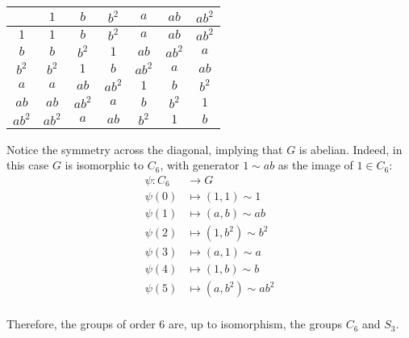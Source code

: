 \begin{center}
  \begin{table}[H]~\label{tab:cayley-table-order-6=b}
    \begin{tabular}{|c|c|c|c|c|c|c|}
      \hline
      & $1$ & $b$ & $b^2$ & $a$ & $ab$ & $ab^2$ \\
      \midrule
      $1$ & $1$ & $b$ & $b^2$ & $a$ & $ab$ & $ab^2$ \\
      $b$ & $b$ & $b^2$ & $1$ & $ab$ & $ab^2$ & $a$ \\
      $b^2$ & $b^2$ & $1$ & $b$ & $ab^2$ & $a$ & $ab$ \\
      $a$ & $a$ & $ab$ & $ab^2$ & $1$ & $b$ & $b^2$ \\
      $ab$ & $ab$ & $ab^2$ & $a$ & $b$ & $b^2$ & $1$ \\
      $ab^2$ & $ab^2$ & $a$ & $ab$ & $b^2$ & $1$ & $b$ \\
      \bottomrule
    \end{tabular}
  \end{table}
\end{center}

Notice the symmetry across the diagonal, implying that $G$ is abelian.
Indeed, in this case $G$ is isomorphic to $C_6$,
with generator $1 \sim ab$
as the image of $1 \in C_6$:
\begin{align*}
  \psi \colon C_6 &\to G \\
  \psi(0) &\mapsto (1, 1) \sim 1 \\
  \psi(1) &\mapsto (a, b) \sim ab \\
  \psi(2) &\mapsto (1, b^2) \sim b^2 \\
  \psi(3) &\mapsto (a, 1) \sim a \\
  \psi(4) &\mapsto (1, b) \sim b \\
  \psi(5) &\mapsto (a, b^2) \sim ab^2 \\
\end{align*}

Therefore, the groups of order $6$ are, up to isomorphism, the groups $C_6$ and $S_3$.
